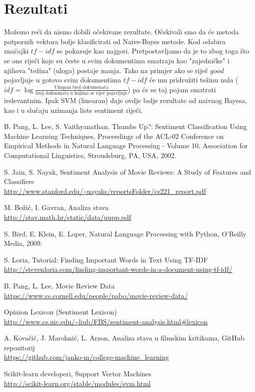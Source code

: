 \documentclass[conference]{IEEEtran}
\begin{document}
\section{Rezultati}
Možemo reći da nismo dobili očekivane rezultate. Očekivali smo da će metoda potpornih vektora bolje klasificirati od Naive-Bayes metode. Kod odabira značajki $tf-idf$ se pokazuje kao najgori. Pretpostavljamo da je to zbog toga što se one riječi koje su česte u svim dokumentima smatraju kao "zajedničke" i njihova "težina" (uloga) postaje manja. Tako na primjer ako se riječ $good$ pojavljuje u gotovo svim dokumentima $tf-idf$ će mu pridružiti težinu nula ($idf=\log \frac{\text{Ukupan broj dokumenata}}{\text{broj dokuemata u kojima se riječ pojavljuje}}$) pa će se taj pojam smatrati irelevantnim. Ipak SVM (linearan) daje ovdje bolje rezultate od naivnog Bayesa, kao i u slučaju uzimanja liste sentiment riječi.
\begin{thebibliography}{1}

	B. Pang, L. Lee, S. Vaithyanathan,
 	Thumbs Up?: Sentiment Classification Using Machine Learning Techniques,
 	Proceedings of the ACL-02 Conference on Empirical Methods in Natural Language Processing - Volume 10,
 	Association for Computational Linguistics,
	Stroudsburg, PA, USA,
	2002.
	
	S. Jain, S. Nayak,
	Sentiment Analysis of Movie Reviews: A Study of Features and Classifiers\\
	\url{http://www.stanford.edu/~nayaks/reportsFolder/cs221_report.pdf}
	
	M. Božić, I. Gavran,
	Analiza stava\\
	\url{http://stav.math.hr/static/data/uupp.pdf}
	
	S. Bird, E. Klein, E. Loper,
	Natural Language Processing with Python,
	O'Reilly Media,
	2009.
	
	S. Loria,
	Tutorial: Finding Important Words in Text Using TF-IDF\\
	\url{http://stevenloria.com/finding-important-words-in-a-document-using-tf-idf/}

	B. Pang, L. Lee,
	Movie Review Data\\
	\url{https://www.cs.cornell.edu/people/pabo/movie-review-data/}
	
	Opinion Lexicon (Sentiment Lexicon)\\
	\url{http://www.cs.uic.edu/~liub/FBS/sentiment-analysis.html#lexicon}
	
	A. Kovačić, J. Marohnić, L. Arzon,
	Analiza stava u filmskim kritikama,
	GitHub repozitorij\\
	\url{https://github.com/janko-m/college-machine_learning}

    Scikit-learn developeri,
    Support Vector Machines\\
    \url{http://scikit-learn.org/stable/modules/svm.html}

\end{thebibliography}
\end{document}
